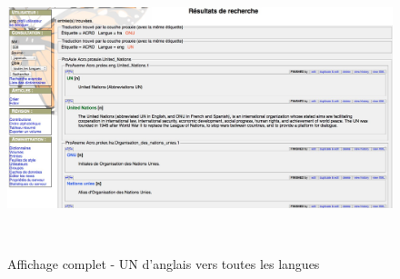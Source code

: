 \documentclass[10pt,a4paper,twoside]{article}
\begin{document}
\begin{itemize}
\begin{figure}[htbp] 
\begin{center} 
\includegraphics[width=14cm]{images/scenario2.jpg}
\end{center} 
\caption{Affichage complet - UN d'anglais vers toutes les langues} \label{image} \
\end{figure}



\end{itemize}
\end{document}

